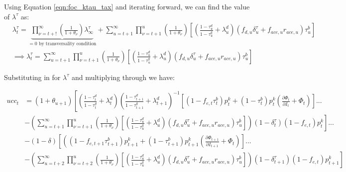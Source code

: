 Using Equation \ref{eqn:foc_ktau_tax} and iterating forward, we can find the value of $\lambda^{\tau}$ as:
\begin{equation}
\begin{split}
& \lambda^{\tau}_{t}=\underbrace{\prod_{\nu=t+!}^{\infty}\left(\frac{1}{1+\theta_{\nu}}\right)\lambda^{\tau}_{\infty}}_{=0 \text{ by transversality condition}} + \sum_{u=t+1}^{\infty} \prod_{\nu=t+1}^{u}\left(\frac{1}{1+\theta_{\nu}}\right)\left[\left(\frac{1-\tau^{d}_{u}}{1-\tau^{g}_{u}}+\lambda^{d}_{u}\right)\left( f_{d,u}\delta^{\tau}_{u}+f_{ace,u}r_{ace,u} \right)\tau^{b}_{u}\right]\\
&\implies  \lambda^{\tau}_{t}= \sum_{u=t+1}^{\infty} \prod_{\nu=t+1}^{u}\left(\frac{1}{1+\theta_{\nu}}\right)\left[\left(\frac{1-\tau^{d}_{u}}{1-\tau^{g}_{u}}+\lambda^{d}_{u}\right)\left( f_{d,u}\delta^{\tau}_{u}+f_{ace,u}r_{ace,u} \right)\tau^{b}_{u}\right]
\end{split}
\end{equation}

Substituting in for $\lambda^{\tau}$ and multiplying through we have:

\begin{equation}
\begin{split}
ucc_{t} &=  \left({1+\theta_{u+1}}\right)\left[\left(\frac{1-\tau^{d}_{t}}{1-\tau^{g}_{t}} + \lambda^{d}_{t}\right) \left(\frac{1-\tau^{d}_{t+1}}{1-\tau^{g}_{t+1}} + \lambda^{d}_{t+1} \right)^{-1}\left[(1-f_{e,t}\tau^{b}_{t})p^{k}_{t}+ (1-\tau^{b}_{t})p^{k}_{t}\left(\frac{\partial \Phi_{t}}{\partial I_{t}} + \Phi_{t}\right)\right]... \right. \\
& \left. -  \left( \sum_{u=t+1}^{\infty} \prod_{\nu=t+1}^{u}\left(\frac{1}{1+\theta_{\nu}}\right)\left[\left(\frac{1-\tau^{d}_{u}}{1-\tau^{g}_{u}}+\lambda^{d}_{u}\right)\left( f_{d,u}\delta^{\tau}_{u}+f_{ace,u}r_{ace,u} \right)\tau^{b}_{u}\right]\right) (1-\delta^{\tau}_{t})(1-f_{e,t})p^{k}_{t}\right] ...   \\
& - (1-\delta)\left[ \left((1-f_{e,t+1}\tau^{b}_{t+1})p^{k}_{t+1}+ (1-\tau^{b}_{t+1})p^{k}_{t+1}\left(\frac{\partial \Phi_{t+1}}{\partial I_{t+1}} + \Phi_{t}\right)\right] ... \right. \\
& \left. - \left(  \sum_{u=t+2}^{\infty} \prod_{\nu=t+2}^{u}\left(\frac{1}{1+\theta_{\nu}}\right)\left[\left(\frac{1-\tau^{d}_{u}}{1-\tau^{g}_{u}}+\lambda^{d}_{u}\right)\left( f_{d,u}\delta^{\tau}_{u}+f_{ace,u}r_{ace,u} \right)\tau^{b}_{u}\right] \right)(1-\delta^{\tau}_{t+1})(1-f_{e,t})p^{k}_{t+1}\right]
\end{split}
\end{equation}

